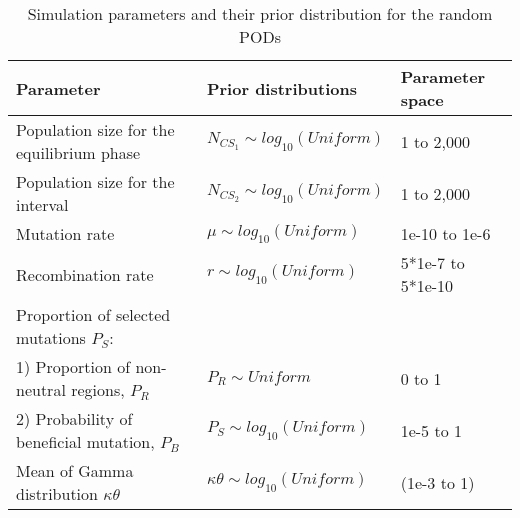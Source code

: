 \documentclass[12pt]{article}
\begin{document}
\begin{table}[ht]
 \caption{Simulation parameters and their prior distribution for the random PODs}
  \centering
  \label{table:table1}
  \begin{tabular}{lll}
   \cmidrule(r){1-3}
    Parameter                                           & Prior distributions                   & Parameter space\\
    \midrule
    Population size for the equilibrium phase           & $N_{CS_{1}} \sim log_{10}(Uniform)$   & 1 to 2,000\\
    Population size for the interval                    & $N_{CS_{2}}  \sim log_{10}(Uniform)$  & 1 to 2,000\\
    Mutation rate                                       & $\mu \sim log_{10}(Uniform)$          & 1e-10 to 1e-6\\
    Recombination rate                                  & $r \sim log_{10}(Uniform)$            & 5*1e-7 to 5*1e-10\\
    Proportion of selected mutations $P_{S}$:           &                                       &                  \\
        1) Proportion of non-neutral regions, $P_{R}$   & $P_{R} \sim Uniform$                  & 0 to 1\\
        2) Probability of beneficial mutation, $P_{B}$  & $P_{S} \sim log_{10}(Uniform)$        & 1e-5 to 1\\ 
    Mean of Gamma distribution $\kappa\theta$           & $\kappa\theta \sim log_{10}(Uniform)$ & (1e-3 to 1)\\
    \bottomrule
  \end{tabular}
  \label{tab:tab1}
\end{table}
\end{document}
